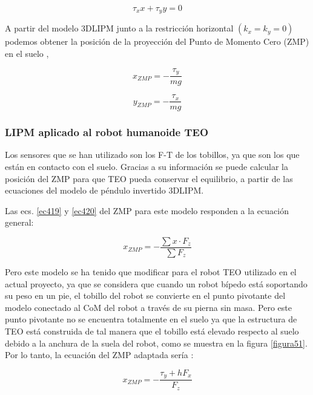 \begin{equation}
\tau_{x} x + \tau_{y} y = 0
\label{ec418}
\end{equation}

A partir del modelo 3DLIPM junto a la restricción horizontal $(k_x=k_y=0)$ podemos obtener la posición de la proyección del Punto de Momento Cero (ZMP) en el suelo \cite{ref33},

\begin{equation}
x_{ZMP} = -\frac{\tau_y}{mg}
\label{ec419}
\end{equation}

\begin{equation}
y_{ZMP} = -\frac{\tau_x}{mg}
\label{ec420}
\end{equation}

\subsubsection{LIPM aplicado al robot humanoide TEO}

Los sensores que se han utilizado son los F-T de los tobillos, ya que son los que están en contacto con el suelo. Gracias a su información se puede calcular la posición del ZMP para que TEO pueda conservar el equilibrio, a partir de las ecuaciones del modelo de péndulo invertido 3DLIPM. 

Las ecs. \ref{ec419} y \ref{ec420} del ZMP para este modelo responden a la ecuación general:

\begin{equation}
x_{ZMP}=-\frac{\sum x\cdot F_z}{\sum F_z}
\label{ec421}
\end{equation}

Pero este modelo se ha tenido que modificar para el robot TEO utilizado en el actual proyecto, ya que se considera que cuando un robot bípedo está soportando su peso en un pie, el tobillo del robot se convierte en el punto pivotante del modelo conectado al CoM del robot a través de su pierna sin masa. Pero este punto pivotante no se encuentra totalmente en el suelo ya que la estructura de TEO está construida de tal manera que el tobillo está elevado respecto al suelo debido a la anchura de la suela del robot, como se muestra en la figura \ref{figura51}. Por lo tanto, la ecuación del ZMP adaptada sería \cite{ref21}:

\begin{equation}
x_{ZMP}=-\frac{\tau_y + h F_x}{F_z}
\label{ec422}
\end{equation}

